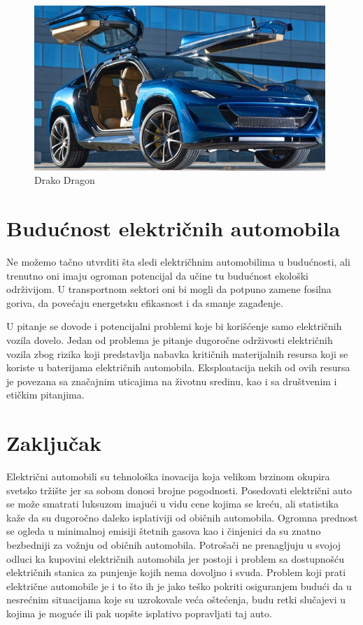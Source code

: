 \documentclass[a4paper]{article}
\begin{document}
\begin{figure}[h]
        \centering
        \includegraphics[width=110mm,scale=0.5]{DRAKO.jpg}
        \caption{Drako Dragon}
        \label{fig:img_DRAKO}
        \end{figure}


\section{Budućnost električnih automobila}
\label {sec:buducnost}

Ne možemo tačno utvrditi šta sledi električhnim automobilima u budućnosti, ali trenutno oni imaju ogroman potencijal da učine tu budućnost ekološki održivijom. U transportnom sektori oni bi mogli da potpuno zamene fosilna goriva, da povećaju energetsku efikasnost i da smanje zagađenje.

U pitanje se dovode i potencijalni problemi koje bi korišćenje samo električnih vozila dovelo. Jedan od problema je pitanje dugoročne održivosti električnih vozila zbog rizika koji predstavlja nabavka kritičnih materijalnih resursa koji se koriste u baterijama električnih automobila. Eksploatacija nekih od ovih resursa je povezana sa značajnim uticajima na životnu sredinu, kao i sa društvenim i etičkim pitanjima.
\cite{buducnost}

\newpage
\section{Zaključak}
\label{sec:zakljucak}

Električni automobili su tehnološka inovacija koja velikom brzinom okupira svetsko tržište jer sa sobom donosi brojne pogodnosti. Posedovati električni auto se može smatrati luksuzom imajući u vidu cene kojima se kreću, ali statistika kaže da su dugoročno daleko isplativiji od običnih automobila. Ogromna prednost se ogleda u minimalnoj emisiji štetnih gasova kao i činjenici da su znatno bezbedniji za vožnju od običnih automobila. Potrošači ne prenagljuju u svojoj odluci ka kupovini električnih automobila jer postoji i problem sa dostupnošću električnih stanica za punjenje kojih nema dovoljno i svuda. Problem koji prati električne automobile je i to što ih je jako teško pokriti osiguranjem budući da u nesrećnim situacijama koje su uzrokovale veća oštećenja, budu retki slučajevi u kojima je moguće ili pak uopšte isplativo popravljati taj auto.
\end{document}
